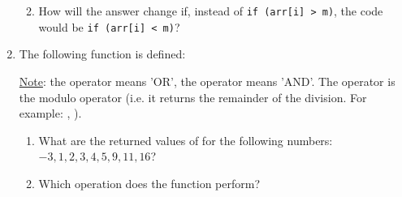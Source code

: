 \begin{enumerate}
\begin{enumerate}
{\begin{answer}
           \end{answer}
           }\fi
         \item How will the answer change if, instead of
           \lstinline!if (arr[i] > m)!,
           the code would be
           \lstinline!if (arr[i] < m)!?
          \if{}\fi
       \end{enumerate}

  \item The following function is defined:
        
        \underline{Note}: the operator \LS{||} means 'OR', the operator \LS{&&} means 'AND'. The operator \LS{\%} is the modulo operator (i.e. it returns the remainder of the division. For example: , ).
        \begin{enumerate}
          \item What are the returned values of  for the following numbers: $-3, 1, 2, 3, 4, 5, 9, 11, 16$?
           \if{}\fi
          \item Which operation does the function perform?
           \if{}
\end{enumerate}
\end{enumerate}
